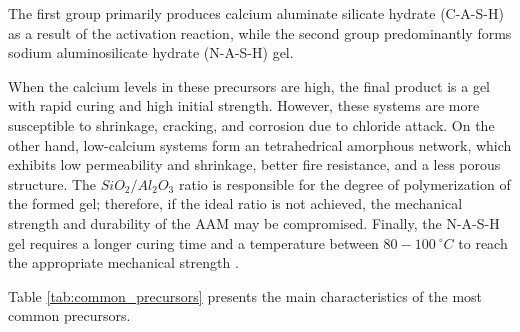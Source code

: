 The first group primarily produces calcium aluminate silicate hydrate (C-A-S-H) as a result of the activation reaction, while the second group predominantly forms sodium aluminosilicate hydrate (N-A-S-H) gel.

When the calcium levels in these precursors are high, the final product is a gel with rapid curing and high initial strength. However, these systems are more susceptible to shrinkage, cracking, and corrosion due to chloride attack.
On the other hand, low-calcium systems form an tetrahedrical amorphous network, which exhibits low permeability and shrinkage, better fire resistance, and a less porous structure.
The $SiO_2/Al_2O_3$ ratio is responsible for the degree of polymerization of the formed gel; therefore, if the ideal ratio is not achieved, the mechanical strength and durability of the AAM may be compromised.
Finally, the N-A-S-H gel requires a longer curing time and a temperature between $80-100\ ^\circ C$ to reach the appropriate mechanical strength \cite{Nodehi2021}.

Table \ref{tab:common_precursors} presents the main characteristics of the most common precursors.

